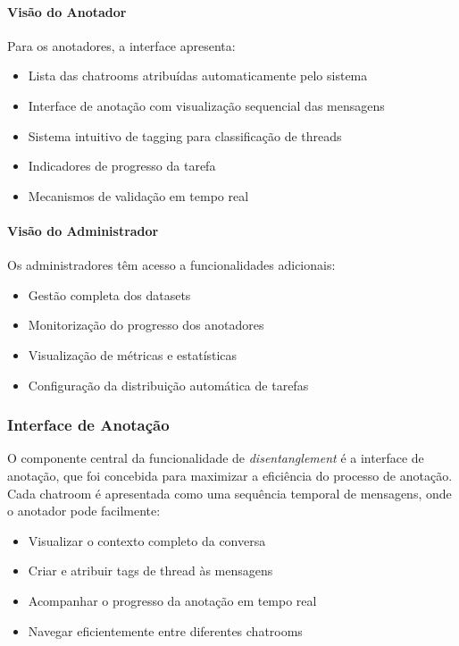 \paragraph{Visão do Anotador}
Para os anotadores, a interface apresenta:
\begin{itemize}
    \item Lista das chatrooms atribuídas automaticamente pelo sistema
    \item Interface de anotação com visualização sequencial das mensagens
    \item Sistema intuitivo de tagging para classificação de threads
    \item Indicadores de progresso da tarefa
    \item Mecanismos de validação em tempo real
\end{itemize}

\paragraph{Visão do Administrador}
Os administradores têm acesso a funcionalidades adicionais:
\begin{itemize}
    \item Gestão completa dos datasets
    \item Monitorização do progresso dos anotadores
    \item Visualização de métricas e estatísticas
    \item Configuração da distribuição automática de tarefas
\end{itemize}

\subsubsection{Interface de Anotação}
O componente central da funcionalidade de \textit{disentanglement} é a interface de anotação, que foi concebida para maximizar a eficiência do processo de anotação. Cada chatroom é apresentada como uma sequência temporal de mensagens, onde o anotador pode facilmente:
\begin{itemize}
    \item Visualizar o contexto completo da conversa
    \item Criar e atribuir tags de thread às mensagens
    \item Acompanhar o progresso da anotação em tempo real
    \item Navegar eficientemente entre diferentes chatrooms
\end{itemize}

